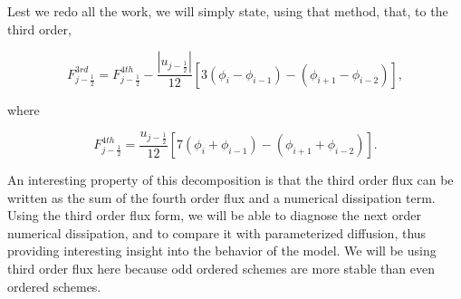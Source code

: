\documentclass[11pt]{article}
\begin{document}
Lest we redo all the work, we will simply state, using that method, that, to the third order,

\begin{equation}
F_{j-\frac{1}{2}}^{3rd} = F_{j-\frac{1}{2}}^{4th} - \frac{|u_{j-\frac{1}{2}}|}{12}[3(\phi_i - \phi_{i-1}) - (\phi_{i+1}- \phi_{i-2})],
\end{equation}

where

\begin{equation}
F_{j-\frac{1}{2}}^{4th} = \frac{u_{j-\frac{1}{2}}}{12}[7(\phi_i + \phi_{i-1}) - (\phi_{i+1} + \phi_{i-2})].
\end{equation}

An interesting property of this decomposition is that the third order flux can be written as the sum of the fourth order flux and a numerical dissipation term. Using the third order flux form, we will be able to diagnose the next order numerical dissipation, and to compare it with parameterized diffusion, thus providing interesting insight into the behavior of the model. We will be using third order flux here because odd ordered schemes are more stable than even ordered schemes. 
\end{document}
